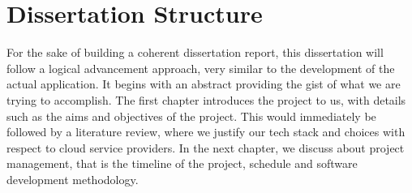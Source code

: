 \section{Dissertation Structure} 

For the sake of building a coherent dissertation report, this dissertation will follow a logical advancement approach, very similar to the development of the actual application. It begins with an abstract providing the gist of what we are trying to accomplish. The first chapter introduces the project to us, with details such as the aims and objectives of the project. This would immediately be followed by a literature review, where we justify our tech stack and choices with respect to cloud service providers. In the next chapter, we discuss about project management, that is the timeline of the project, schedule and software development methodology.


